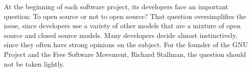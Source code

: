 At the beginning of each software project, its developers face an important
question: To open source or not to open source? That question oversimplifies the
issue, since developers use a variety of other models that are a mixture of
open source and closed source models. Many developers decide almost
instinctively, since they often have strong opinions on the subject. For the
founder of the GNU Project and the Free Software Movement, Richard Stallman, the
question should not be taken lightly.
